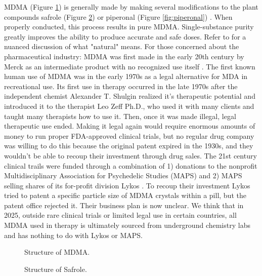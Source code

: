 \documentclass[12pt,letterpaper]{book}
\begin{document}
\begin{itemize}
        MDMA (Figure \ref{fig:mdma}) is generally made by making several modifications to the plant compounds safrole (Figure \ref{fig:safrole}) or piperonal (Figure \ref{fig:piperonal}) \cite{worldDrugReport,euMDMA}. When properly conducted, this process results in pure MDMA. Single-substance purity greatly improves the ability to produce accurate and safe doses. Refer to \textcite{ruggeriNatural} for a nuanced discussion of what "natural" means. For those concerned about the pharmaceutical industry: MDMA was first made in the early 20th century by Merck as an intermediate product with no recognized use itself \cite{passieHistory}. The first known human use of MDMA was in the early 1970s as a legal alternative for MDA in recreational use. Its first use in therapy occurred in the late 1970s after the independent chemist Alexander T. Shulgin realized it's therapeutic potential and introduced it to the therapist Leo Zeff Ph.D., who used it with many clients and taught many therapists how to use it. Then, once it was made illegal, legal therapeutic use ended. Making it legal again would require enormous amounts of money to run proper FDA-approved clinical trials, but no regular drug company was willing to do this because the original patent expired in the 1930s, and they wouldn't be able to recoup their investment through drug sales. The 21st century clinical trails were funded through a combination of 1) donations to the nonprofit Multidisciplinary Association for Psychedelic Studies (MAPS) and 2) MAPS selling shares of its for-profit division Lykos \cite{lykosPatents}. To recoup their investment Lykos tried to patent a specific particle size of MDMA crystals within a pill, but the patent office rejected it. Their business plan is now unclear. We think that in 2025, outside rare clinical trials or limited legal use in certain countries, all MDMA used in therapy is ultimately sourced from underground chemistry labs and has nothing to do with Lykos or MAPS.
        \FloatBarrier
        \begin{figure}[htbp]
            \centering
            \caption{Structure of MDMA.}
            \label{fig:mdma}
        \end{figure}
        \begin{figure}[htbp]
            \centering
            \caption{Structure of Safrole.}
            \label{fig:safrole}
        \end{figure}

\end{itemize}
\end{document}
